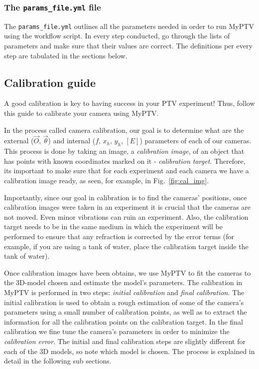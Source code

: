 \documentclass[10pt,a4paper]{article}
\begin{document}
\subsubsection{The \texttt{params\_file.yml} file}

The \texttt{params\_file.yml} outlines all the parameters needed in order to run MyPTV using the workflow script. In every step conducted, go through the lists of parameters and make sure that their values are correct. The definitions per every step are tabulated in the sections below.







\subsection{Calibration guide} \label{sec:cal_guide}


A good calibration is key to having success in your PTV experiment! Thus, follow this guide to calibrate your camera using MyPTV. 


In the process called camera calibration, our goal is to determine what are the external ($\vec{O}$, $\vec{\theta}$) and internal ($f$, $x_h,\,y_h$, $[E]$) parameters of each of our cameras. This process is done by taking an image, a \textit{calibration image}, of an object that has points with known coordinates marked on it - \textit{calibration target}. Therefore, its important to make sure that for each experiment and each camera we have a calibration image ready, as seen, for example, in Fig.~\ref{fig:cal_img}.


Importantly, since our goal in calibration is to find the cameras' positions, once calibration images were taken in an experiment it is crucial that the cameras are not moved. Even minor vibrations can ruin an experiment. Also, the calibration target needs to be in the same medium in which the experiment will be performed to ensure that any refraction is corrected by the error terms (for example, if you are using a tank of water, place the calibration target inside the tank of water). 


Once calibration images have been obtains, we use MyPTV to fit the cameras to the 3D-model chosen and estimate the model's parameters. 
The calibration in MyPTV is performed in two steps: \textit{initial calibration} and \textit{final calibration}. The initial calibration is used to obtain a rough estimation of some of the camera's parameters using a small number of calibration points, as well as to extract the information for all the calibration points on the calibration target. In the final calibration we fine tune the camera's parameters in order to minimize the \textit{calibration error}. 
The initial and final calibration steps are slightly different for each of the 3D models, so note which model is chosen.
The process is explained in detail in the following sub sections. 
\end{document}
